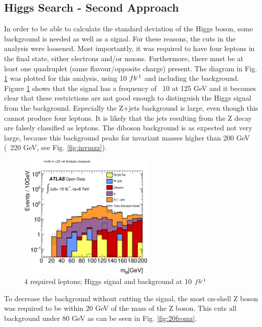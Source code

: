 \documentclass[runningheads,a4paper]{llncs}
\newcommand{\invfb}{fb\textsuperscript{-1}}
\begin{document}
\subsection{Higgs Search - Second Approach}
In order to be able to calculate the standard deviation of the Higgs boson, some background is needed as well as a signal. For these reasons, the cuts in the analysis were loosened. Most importantly, it was required to have four leptons in the final state, either electrons and/or muons. Furthermore, there must be at least one quadruplet (same flavour/opposite charge) present. The diagram in Fig. \ref{fig:loosesthiggs} was plotted for this analysis, using 10 $\invfb$ and including the background.\\

Figure \ref{fig:loosesthiggs} shows that the signal has a frequency of ~10 at 125 GeV and it becomes clear that these restrictions are not good enough to distinguish the Higgs signal from the background. Especially the Z+jets background is large, even though this cannot produce four leptons. It is likely that the jets resulting from the Z decay are falsely classified as leptons. The diboson background is as expected not very large, because this background peaks for invariant masses higher than 200 GeV (~220 GeV, see Fig. \ref{fig:invmzz}). \\

\begin{figure}[H]
\centering
\includegraphics[height=6cm]{higgs_loosest_invm}
\caption{4 required leptons; Higgs signal and background at 10 $\invfb$}
\label{fig:loosesthiggs}
\end{figure}

To decrease the background without cutting the signal, the most on-shell Z boson was required to be within 20 GeV of the mass of the Z boson. This cuts all background under 80 GeV as can be seen in Fig. \ref{fig:20fromz}.\\
\end{document}
